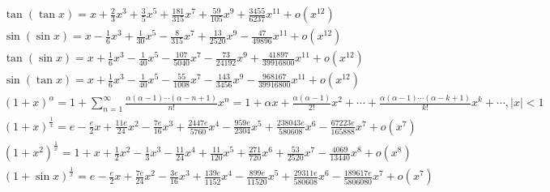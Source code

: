 \[
\begin{aligned}
& \tan (\tan x)=x+\frac{2}{3} x^3+\frac{3}{5} x^5+\frac{181}{315} x^7+\frac{59}{105} x^9+\frac{3455}{6237} x^{11}+o\left(x^{12}\right) \\
& \sin (\sin x)=x-\frac{1}{6} x^3+\frac{1}{30} x^5-\frac{8}{315} x^7+\frac{13}{2520} x^9-\frac{47}{49896} x^{11}+o\left(x^{12}\right) \\
& \tan (\sin x)=x+\frac{1}{6} x^3-\frac{1}{40} x^5-\frac{107}{5040} x^7-\frac{73}{24192} x^9+\frac{41897}{39916800} x^{11}+o\left(x^{12}\right) \\
& \sin (\tan x)=x+\frac{1}{6} x^3-\frac{1}{40} x^5-\frac{55}{1008} x^7-\frac{143}{3456} x^9-\frac{968167}{39916800} x^{11}+o\left(x^{12}\right) \\
& (1+x)^\alpha=1+\sum_{n=1}^{\infty} \frac{\alpha(\alpha-1) \cdots(\alpha-n+1)}{n!} x^n=1+\alpha x+\frac{\alpha(\alpha-1)}{2!} x^2+\cdots+\frac{\alpha(\alpha-1) \cdots(\alpha-k+1)}{k!} x^k+\cdots, \lvert x \rvert <1 \\
& (1+x)^{\frac{1}{x}}=e-\frac{e}{2} x+\frac{11 e}{24} x^2-\frac{7 e}{16} x^3+\frac{2447 e}{5760} x^4-\frac{959 e}{2304} x^5+\frac{238043 e}{580608} x^6-\frac{67223 e}{165888} x^7+o\left(x^7\right) \\
& \left(1+x^2\right)^{\frac{1}{x}}=1+x+\frac{1}{2} x^2-\frac{1}{3} x^3-\frac{11}{24} x^4+\frac{11}{120} x^5+\frac{271}{720} x^6+\frac{53}{2520} x^7-\frac{4069}{13440} x^8+o\left(x^8\right) \\
& (1+\sin x)^{\frac{1}{x}}=e-\frac{e}{2} x+\frac{7 e}{24} x^2-\frac{3 e}{16} x^3+\frac{139 e}{1152} x^4-\frac{899 e}{11520} x^5+\frac{29311 e}{580608} x^6-\frac{189617 e}{5806080} x^7+o\left(x^7\right)
\end{aligned}
\]